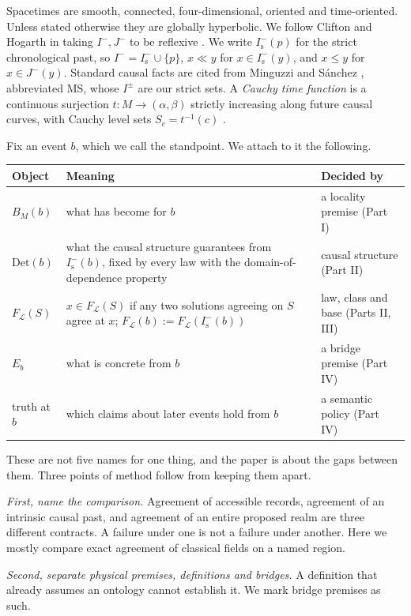 \documentclass[11pt]{article}
\theoremstyle{definition}
\newcommand{\Ichr}{I^{-}}
\newcommand{\Jm}{J^{-}}
\newcommand{\Is}{I^-_{\mathrm s}}
\newcommand{\Det}{\mathrm{Det}}
\begin{document}
Spacetimes are smooth, connected, four-dimensional, oriented and time-oriented.
Unless stated otherwise they are globally hyperbolic. We follow Clifton and Hogarth
in taking $\Ichr,\Jm$ to be reflexive \citep[p.~360]{CH1995}. We write $\Is(p)$ for the
strict chronological past, so $\Ichr=\Is\cup\{p\}$, $x\ll y$ for $x\in\Is(y)$, and
$x\le y$ for $x\in\Jm(y)$. Standard causal facts are cited from Minguzzi and Sánchez
\citep{MS2008}, abbreviated MS, whose $I^\pm$ are our strict sets. A \emph{Cauchy time
function} is a continuous surjection $t:M\to(\alpha,\beta)$ strictly increasing along
future causal curves, with Cauchy level sets $S_c=t^{-1}(c)$ \citep{BS2005}.

Fix an event $b$, which we call the standpoint. We attach to it the following.

\begin{center}
\begin{tabularx}{\textwidth}{@{}lYl@{}}
\toprule
Object & Meaning & Decided by\\
\midrule
$B_M(b)$ & what has become for $b$ & a locality premise (Part I)\\
$\Det(b)$ & what the causal structure guarantees from $\Is(b)$, fixed by every law with the domain-of-dependence property & causal structure (Part II)\\
$F_{\mathcal L}(S)$ & $x\in F_{\mathcal L}(S)$ if any two solutions agreeing on $S$ agree at $x$; $F_{\mathcal L}(b):=F_{\mathcal L}(\Is(b))$ & law, class and base (Parts II, III)\\
$E_b$ & what is concrete from $b$ & a bridge premise (Part IV)\\
truth at $b$ & which claims about later events hold from $b$ & a semantic policy (Part IV)\\
\bottomrule
\end{tabularx}
\end{center}

These are not five names for one thing, and the paper is about the gaps between them.
Three points of method follow from keeping them apart.

\emph{First, name the comparison.} Agreement of accessible records, agreement of an
intrinsic causal past, and agreement of an entire proposed realm are three different
contracts. A failure under one is not a failure under another. Here we mostly compare exact agreement of classical fields on a named region.

\emph{Second, separate physical premises, definitions and bridges.} A definition that
already assumes an ontology cannot establish it. We mark bridge premises as such.
\end{document}
